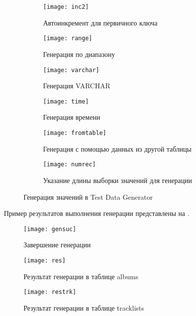 \begin{figure}[H]
	\begin{subfigure}{.5\linewidth}
		\centering
		\texttt{[image: inc2]}
		\caption{Автоинкремент для первичного ключа}
		\label{pic:inc2}
	\end{subfigure}
	\begin{subfigure}{.5\linewidth}
		\centering
		\texttt{[image: range]}
		\caption{Генерация по диапазону}
		\label{pic:range}
	\end{subfigure}
	\begin{subfigure}{.5\linewidth}
		\centering
		\texttt{[image: varchar]}
		\caption{Генерация VARCHAR}
		\label{pic:varchar}
	\end{subfigure}
	\begin{subfigure}{.5\linewidth}
		\centering
		\texttt{[image: time]}
		\caption{Генерация времени}
		\label{pic:time}
	\end{subfigure}
	\begin{subfigure}{.5\linewidth}
		\centering
		\texttt{[image: fromtable]}
		\caption{Генерация с помощью данных из другой таблицы}
		\label{pic:fromtable}
	\end{subfigure}
	\begin{subfigure}{.5\linewidth}
		\centering
		\texttt{[image: numrec]}
		\caption{Указание длины выборки значений для генерации}
		\label{pic:numrec}
	\end{subfigure}
\caption{Генерация значений в Test Data Generator}
\label{pic:gen}
\end{figure}

Пример результатов выполнения генерации представлены на .

\begin{figure}[ht]
	\centering
	\texttt{[image: gensuc]}
	\caption{Завершение генерации}
	\label{pic:gensuc}
\end{figure}

\begin{figure}[ht]
	\centering
	\texttt{[image: res]}
	\caption{Результат генерации в таблице albums}
	\label{pic:res}
\end{figure}

\begin{figure}[H]
	\centering
	\texttt{[image: restrk]}
	\caption{Результат генерации в таблице tracklists}
	\label{pic:restrk}
\end{figure}